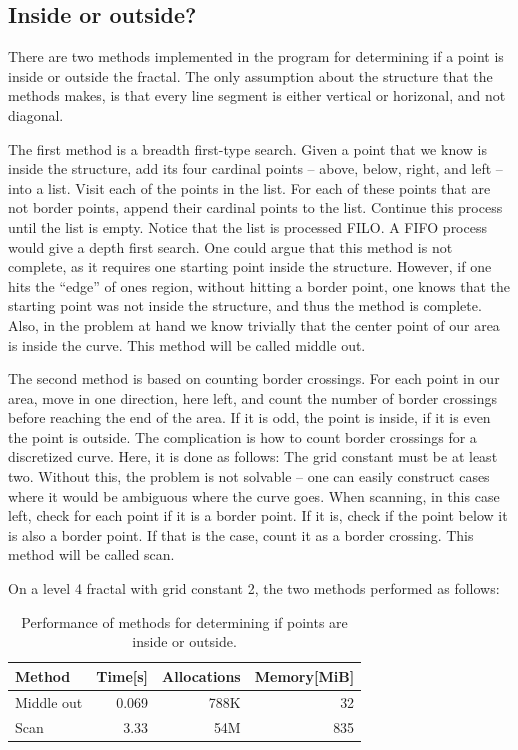 \documentclass[a4paper, 12pt]{article}
\begin{document}
\subsection{Inside or outside?}
There are two methods implemented in the program for determining if a point is inside or outside the fractal.
The only assumption about the structure that the methods makes, is that every line segment is either vertical or horizonal, and not diagonal.

The first method is a breadth first-type search.
Given a point that we know is inside the structure, add its four cardinal points -- above, below, right, and left -- into a list.
Visit each of the points in the list.
For each of these points that are not border points, append their cardinal points to the list.
Continue this process until the list is empty.
Notice that the list is processed FILO.
A FIFO process would give a depth first search.
One could argue that this method is not complete, as it requires one starting point inside the structure.
However, if one hits the ``edge'' of ones region, without hitting a border point, one knows that the starting point was not inside the structure, and thus the method is complete.
Also, in the problem at hand we know trivially that the center point of our area is inside the curve.
This method will be called middle out.

The second method is based on counting border crossings.
For each point in our area, move in one direction, here left, and count the number of border crossings before reaching the end of the area.
If it is odd, the point is inside, if it is even the point is outside.
The complication is how to count border crossings for a discretized curve.
Here, it is done as follows:
The grid constant must be at least two.
Without this, the problem is not solvable -- one can easily construct cases where it would be ambiguous where the curve goes.
When scanning, in this case left, check for each point if it is a border point.
If it is, check if the point below it is also a border point.
If that is the case, count it as a border crossing.
This method will be called scan.

On a level 4 fractal with grid constant 2, the two methods performed as follows:
\begin{table}
  \centering
\begin{tabular}{lrrr}
  Method& Time[s]& Allocations& Memory[MiB]\\
  \hline
  Middle out& 0.069& 788K& 32\\
  Scan& 3.33& 54M& 835
\end{tabular}
\caption{Performance of methods for determining if points are inside or outside.}
\end{table}
\end{document}
